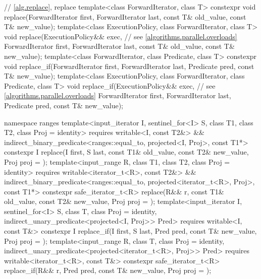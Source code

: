 \begin{codeblock}
{  // \ref{alg.replace}, replace
  template<class ForwardIterator, class T>
    constexpr void replace(ForwardIterator first, ForwardIterator last,
                           const T& old_value, const T& new_value);
  template<class ExecutionPolicy, class ForwardIterator, class T>
    void replace(ExecutionPolicy&& exec,                        // see \ref{algorithms.parallel.overloads}
                 ForwardIterator first, ForwardIterator last,
                 const T& old_value, const T& new_value);
  template<class ForwardIterator, class Predicate, class T>
    constexpr void replace_if(ForwardIterator first, ForwardIterator last,
                              Predicate pred, const T& new_value);
  template<class ExecutionPolicy, class ForwardIterator, class Predicate, class T>
    void replace_if(ExecutionPolicy&& exec,                     // see \ref{algorithms.parallel.overloads}
                    ForwardIterator first, ForwardIterator last,
                    Predicate pred, const T& new_value);

  namespace ranges {
    template<input_iterator I, sentinel_for<I> S, class T1, class T2, class Proj = identity>
      requires writable<I, const T2&> &&
               indirect_binary_predicate<ranges::equal_to, projected<I, Proj>, const T1*>
      constexpr I
        replace(I first, S last, const T1& old_value, const T2& new_value, Proj proj = {});
    template<input_range R, class T1, class T2, class Proj = identity>
      requires writable<iterator_t<R>, const T2&> &&
               indirect_binary_predicate<ranges::equal_to,
                                         projected<iterator_t<R>, Proj>, const T1*>
      constexpr safe_iterator_t<R>
        replace(R&& r, const T1& old_value, const T2& new_value, Proj proj = {});
    template<input_iterator I, sentinel_for<I> S, class T, class Proj = identity,
             indirect_unary_predicate<projected<I, Proj>> Pred>
      requires writable<I, const T&>
      constexpr I replace_if(I first, S last, Pred pred, const T& new_value, Proj proj = {});
    template<input_range R, class T, class Proj = identity,
             indirect_unary_predicate<projected<iterator_t<R>, Proj>> Pred>
      requires writable<iterator_t<R>, const T&>
      constexpr safe_iterator_t<R>
        replace_if(R&& r, Pred pred, const T& new_value, Proj proj = {});
  }

}
\end{codeblock}
